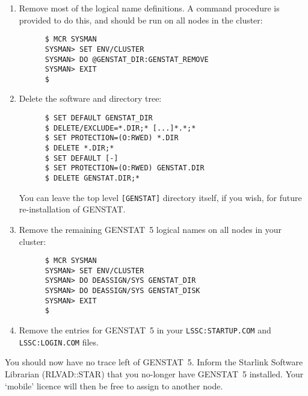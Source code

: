 \begin{enumerate}
\item Remove most of the logical name definitions. A command procedure is
provided to do this, and should be run on all nodes in the cluster:
\begin{verbatim}
      $ MCR SYSMAN
      SYSMAN> SET ENV/CLUSTER
      SYSMAN> DO @GENSTAT_DIR:GENSTAT_REMOVE
      SYSMAN> EXIT
      $
\end{verbatim}
\item Delete the software and directory tree:
\begin{verbatim}
      $ SET DEFAULT GENSTAT_DIR
      $ DELETE/EXCLUDE=*.DIR;* [...]*.*;*
      $ SET PROTECTION=(O:RWED) *.DIR
      $ DELETE *.DIR;*
      $ SET DEFAULT [-]
      $ SET PROTECTION=(O:RWED) GENSTAT.DIR
      $ DELETE GENSTAT.DIR;*
\end{verbatim}
You can leave the top level {\tt [GENSTAT]} directory itself, if you wish, for
future re-installation of GENSTAT.

\item Remove the remaining GENSTAT~5 logical names on all nodes in your
cluster:
\begin{verbatim}
      $ MCR SYSMAN
      SYSMAN> SET ENV/CLUSTER
      SYSMAN> DO DEASSIGN/SYS GENSTAT_DIR
      SYSMAN> DO DEASSIGN/SYS GENSTAT_DISK
      SYSMAN> EXIT
      $
\end{verbatim}
\item Remove the entries for GENSTAT~5 in your {\tt LSSC:STARTUP.COM} and
{\tt LSSC:LOGIN.COM} files.
\end{enumerate}

You should now have no trace left of GENSTAT~5. Inform the Starlink Software
Librarian (RLVAD::STAR) that you no-longer have GENSTAT~5 installed. Your
`mobile' licence will then be free to assign to another node. 

